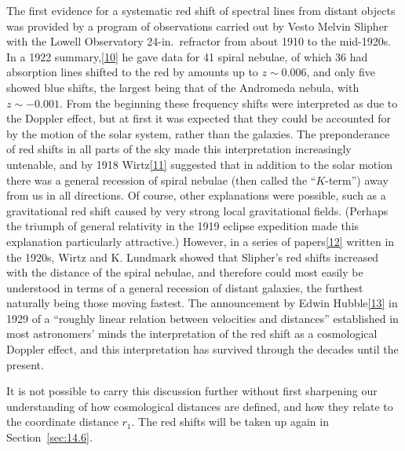 The first evidence for a systematic red shift of spectral lines from distant
objects was provided by a program of observations carried out by Vesto Melvin
Slipher with the Lowell Observatory 24-in.\ refractor from about 1910 to the
mid-1920s. In a 1922 summary,\hyperref[ch14-ref-10]{[10]} he gave data for 41
spiral nebulae, of which 36 had absorption lines shifted to the red by amounts
up to \(z\sim0.006\), and only five showed blue shifts, the largest being that
of the Andromeda nebula, with \(z\sim-0.001\). From the beginning these
frequency shifts were interpreted as due to the Doppler effect, but at first
it was expected that they could be accounted for by the motion of the solar
system, rather than the galaxies. The preponderance of red shifts in all
parts of the sky made this interpretation increasingly untenable, and by 1918
Wirtz\hyperref[ch14-ref-11]{[11]} suggested that in addition to the solar
motion there was a general recession of spiral nebulae (then called the
``\(K\)-term'') away from us in all directions. Of course, other
explanations were possible, such as a gravitational red shift caused by very
strong local gravitational fields. (Perhaps the triumph of general relativity
in the 1919 eclipse expedition made this explanation particularly
attractive.) However, in a series of
papers\hyperref[ch14-ref-12]{[12]} written in the 1920s, Wirtz and K.
Lundmark showed that Slipher's red shifts increased with the distance of the
spiral nebulae, and therefore could most easily be understood in terms of a
general recession of distant galaxies, the furthest naturally being those
moving fastest. The announcement by Edwin
Hubble\hyperref[ch14-ref-13]{[13]} in 1929 of a ``roughly linear relation
between velocities and distances'' established in most astronomers' minds the
interpretation of the red shift as a cosmological Doppler effect, and this
interpretation has survived through the decades until the present.

It is not possible to carry this discussion further without first sharpening
our understanding of how cosmological distances are defined, and how they
relate to the coordinate distance \(r_1\). The red shifts will be taken up
again in Section~\ref{sec:14.6}.
